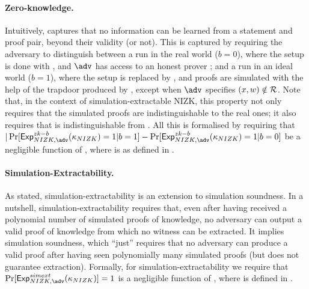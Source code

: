 \paragraph{Zero-knowledge.} %
Intuitively, captures that no information can be learned from a statement and
proof pair, beyond their validity (or not). This is captured by requiring the
adversary to distinguish between a run in the real world ($b=0$), where the
setup is done with \Setup, and $\adv$ has access to an honest prover
\Prove; and a run in an ideal world ($b=1$), where the setup is replaced by
\SimSetup, and proofs are simulated with the help of the trapdoor produced by
\SimSetup, except when $\adv$ specifies $(x,w) \notin \mathcal{R}$. Note
that, in the context of simulation-extractable NIZK, this property not only
requires that the simulated proofs are indistinguishable to the real ones; it
also requires that \SimSetup is indistinguishable from \Setup. All this is
formalised by requiring that $|\Pr[\ExpNIZKZKb(\NIZKsecpar) = 1 | b = 1] -
\Pr[\ExpNIZKZKb(\NIZKsecpar) = 1 | b = 0]$ be a negligible function of \secpar,
where \ExpNIZKZKb is as defined in .

\paragraph{Simulation-Extractability.} As stated, simulation-extractability
is an extension to simulation soundness. In a nutshell,
simulation-extractability requires that, even after having received a polynomial
number of simulated proofs of knowledge, no adversary can output a valid proof
of knowledge from which no witness can be extracted. It implies simulation
soundness, which ``just'' requires that no adversary can produce a valid proof
after having seen polynomially many simulated proofs (but does not guarantee
extraction). Formally, for simulation-extractability we require that
$\Pr[\ExpNIZKSimExt(\NIZKsecpar)] = 1$ is a negligible function of \secpar,
where \ExpNIZKSimExt is defined in .

